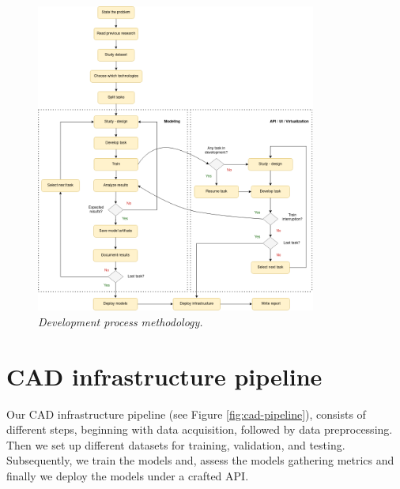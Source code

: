\newpage

\begin{landscape}

  \begin{figure}[H]
  \centering
  \includegraphics[width=0.82\textwidth]{imatges/planing_and_methodology/EmplyedMethodology.png}
  \caption{\textit{Development process methodology.}}
  \label{fig:flux_development}
  \end{figure}

\end{landscape}

\newpage

\section{CAD infrastructure pipeline}

Our CAD infrastructure pipeline  (see Figure \ref{fig:cad-pipeline}), consists
of different steps, beginning with data acquisition, followed by data
preprocessing. Then we set up different datasets for training, validation, and
testing. Subsequently, we train the models and, assess the models gathering
metrics and finally we deploy the models under a crafted API.

